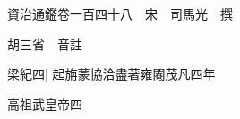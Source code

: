 






























































資治通鑑卷一百四十八　宋　司馬光　撰

胡三省　音註

梁紀四|{
	起旃蒙協洽盡著雍閹茂凡四年}


高祖武皇帝四

